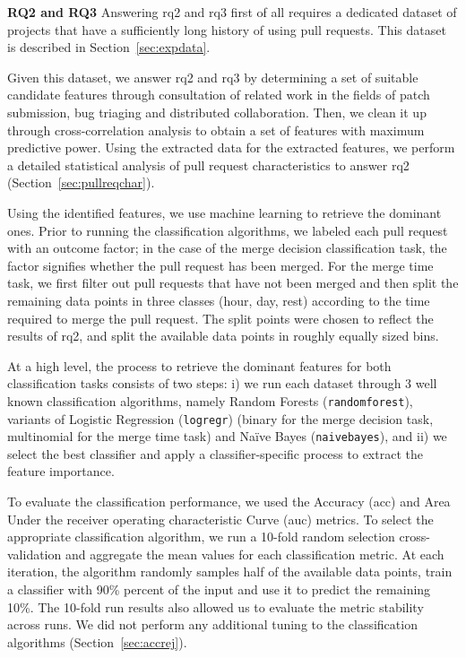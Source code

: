 \documentclass{sig-alternate}
\begin{document}
{\bfseries RQ2 and RQ3} Answering {\sc rq2} and {\sc rq3} first of all requires
a dedicated dataset of projects that have a sufficiently long history of using
pull requests. This dataset is described in Section~\ref{sec:expdata}.

Given this dataset, we answer {\sc rq2} and {\sc rq3} by determining a set of
suitable candidate features through consultation of related work in the fields
of patch submission, bug triaging and distributed collaboration. Then, we clean
it up through cross-correlation analysis to obtain a set of features with
maximum predictive power. Using the extracted data for the extracted features,
we perform a detailed statistical analysis of pull request characteristics to
answer {\sc rq2} (Section~\ref{sec:pullreqchar}).

Using the identified features, we use machine learning to retrieve
the dominant ones. Prior to running the classification algorithms, we labeled
each pull request with an outcome factor; in the case of the \textsf{merge
decision} classification task, the factor signifies whether the pull request
has been merged. For the \textsf{merge time} task, we first filter out pull
requests that have not been merged and then split the remaining data points in
three classes (\textsf{hour}, \textsf{day}, \textsf{rest}) according to the time 
required to merge the pull request. The split points were chosen to reflect the
results of {\sc rq2}, and split the available data points in roughly
equally sized bins.

At a high level, the process to retrieve the dominant features for both
classification tasks consists of two steps: i) we run each dataset through 3
well known classification algorithms, namely Random Forests
(\texttt{randomforest}), variants of Logistic Regression (\texttt{logregr})
(binary for the \textsf{merge decision} task, multinomial for the \textsf{merge
time} task) and Na\"ive Bayes (\texttt{naivebayes}), and ii) we select the best
classifier and apply a classifier-specific process to extract the feature
importance. 

To evaluate the classification performance, we used the Accuracy ({\sc acc}) and
Area Under the receiver operating characteristic Curve ({\sc auc}) metrics. To
select the appropriate classification algorithm, we run a 10-fold random
selection cross-validation and aggregate the mean values for each classification
metric. At each iteration, the algorithm randomly samples half of the
available data points, train a classifier with 90\% percent of the input and
use it to predict the remaining 10\%. The 10-fold run results also allowed us to
evaluate the metric stability across runs. We did not perform any additional
tuning to the classification algorithms (Section~\ref{sec:accrej}).
\end{document}
